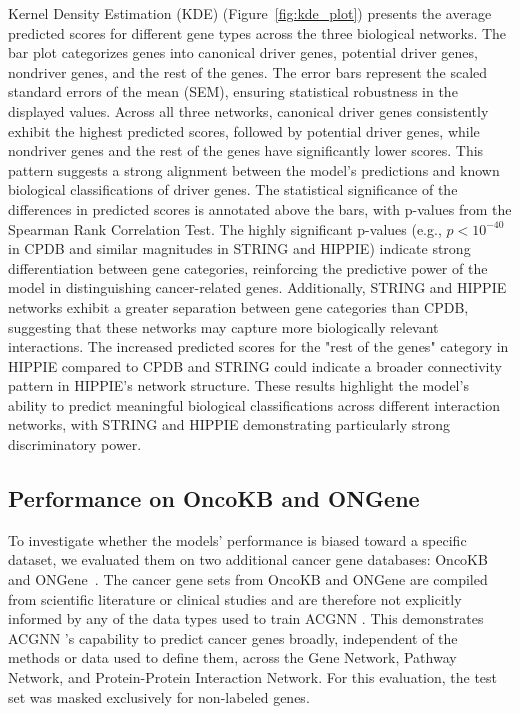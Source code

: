 Kernel Density Estimation (KDE) (Figure~\ref{fig:kde_plot}) presents the average predicted scores for different gene types across the three biological networks. The bar plot categorizes genes into canonical driver genes, potential driver genes, nondriver genes, and the rest of the genes. The error bars represent the scaled standard errors of the mean (SEM), ensuring statistical robustness in the displayed values.
Across all three networks, canonical driver genes consistently exhibit the highest predicted scores, followed by potential driver genes, while nondriver genes and the rest of the genes have significantly lower scores. This pattern suggests a strong alignment between the model’s predictions and known biological classifications of driver genes.
The statistical significance of the differences in predicted scores is annotated above the bars, with p-values from the Spearman Rank Correlation Test. The highly significant p-values (e.g., \( p < 10^{-40} \) in CPDB and similar magnitudes in STRING and HIPPIE) indicate strong differentiation between gene categories, reinforcing the predictive power of the model in distinguishing cancer-related genes.
Additionally, STRING and HIPPIE networks exhibit a greater separation between gene categories than CPDB, suggesting that these networks may capture more biologically relevant interactions. The increased predicted scores for the "rest of the genes" category in HIPPIE compared to CPDB and STRING could indicate a broader connectivity pattern in HIPPIE's network structure.
These results highlight the model’s ability to predict meaningful biological classifications across different interaction networks, with STRING and HIPPIE demonstrating particularly strong discriminatory power.


	

\subsection{Performance on OncoKB and ONGene}
To investigate whether the models’ performance is biased toward a specific dataset, we evaluated them on two additional cancer gene databases: OncoKB~\cite{chakravarty2017oncokb} and ONGene~\cite{liu2017ongene}. The cancer gene sets from OncoKB and ONGene are compiled from scientific literature or clinical studies and are therefore not explicitly informed by any of the data types used to train ACGNN . This demonstrates ACGNN 's capability to predict cancer genes broadly, independent of the methods or data used to define them, across the Gene Network, Pathway Network, and Protein-Protein Interaction Network. For this evaluation, the test set was masked exclusively for non-labeled genes.

